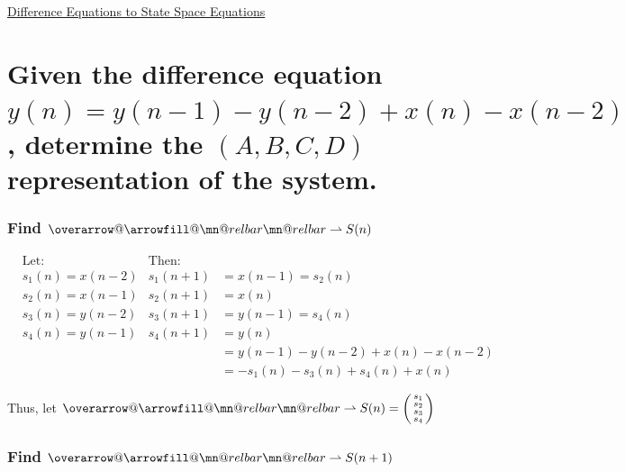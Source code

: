 \documentclass{article}
\makeatletter
\newenvironment{directsubsubs}{
  \makeatletter
  \renewcommand\thesubsubsection{\thesection.\Roman{subsubsection}}
  \makeatother
}{
  \makeatletter
  \renewcommand\thesubsubsection{\thesubsection.\Roman{subsubsection}}
  \makeatother
}
\renewcommand{\thesubsection}{\thesection.\alph{subsection}}
\renewcommand{\thesubsubsection}{\thesection.\alph{subsection}.\Roman{subsubsection}}
\DeclareRobustCommand{\overrightharpoon}{\mathpalette{\overarrow@\rightharpoonfill@}}
\def\rightharpoonfill@{\arrowfill@\mn@relbar\mn@relbar\rightharpoonup}
\makeatother
\begin{document}
\newpage

\begin{center}
	\Large{\underline{Difference Equations to State Space Equations}}
\end{center}

\section[Question ~\thesection]{Given the difference equation $y(n) = y(n - 1) - y(n - 2) + x(n) - x(n - 2)$, determine the $(A, B, C, D)$ representation of the system.}

\begin{directsubsubs}
	
	\subsubsection[~\thesubsubsection]{Find $\overrightharpoon{S(n)}$}
	
	\begin{align*}
		&\text{Let:}& \text{Then:} \\
		&s_1(n) = x(n - 2) &s_1(n + 1) &= x(n - 1) = s_2(n) \\
		&s_2(n) = x(n - 1) &s_2(n + 1) &= x(n) \\
		&s_3(n) = y(n - 2) &s_3(n + 1) &= y(n - 1) = s_4(n) \\
		&s_4(n) = y(n - 1) &s_4(n + 1) &= y(n) \\
		& & &= y(n - 1) - y(n - 2) + x(n) - x(n - 2) \\
		& & &= -s_1(n) - s_3(n) + s_4(n) + x(n)
	\end{align*}

	Thus, let $\overrightharpoon{S(n)} = \begin{psmallmatrix} s_1 \\ s_2 \\ s_3 \\ s_4 \end{psmallmatrix}$

	\subsubsection[~\thesubsubsection]{Find $\overrightharpoon{S(n + 1)}$}
	

\end{directsubsubs}
\end{document}
